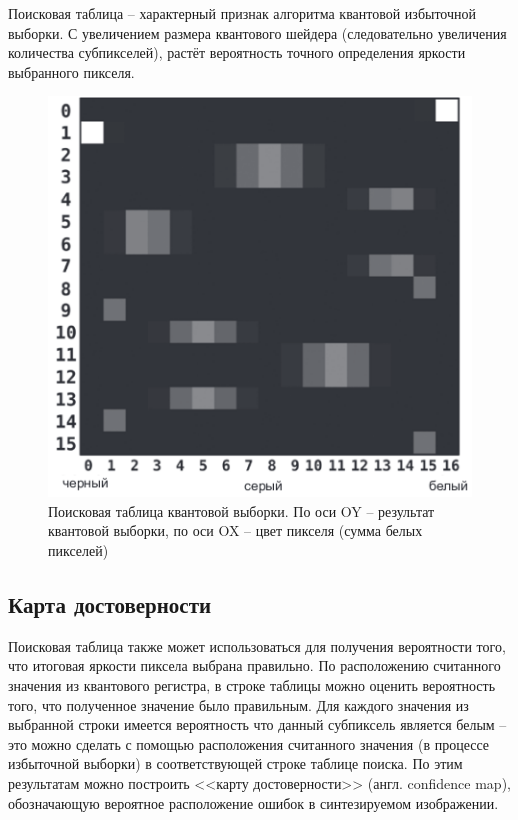 Поисковая таблица -- характерный признак алгоритма квантовой избыточной выборки. С увеличением размера квантового шейдера (следовательно увеличения количества субпикселей), растёт вероятность точного определения яркости выбранного пикселя.

\begin{figure}[H]
	\begin{center}
		\includegraphics[scale=0.55]{img/qss_table.png}
	\end{center}
	\captionsetup{justification=centering}
	\caption{Поисковая таблица квантовой выборки. По оси OY -- результат квантовой выборки, по оси OX -- цвет пикселя (сумма белых пикселей)}
	\label{img:qss_table}
\end{figure}

\subsection{Карта достоверности}\label{map}

Поисковая таблица также может использоваться для получения вероятности того, что итоговая яркости пиксела выбрана правильно. По расположению считанного значения из квантового регистра, в строке таблицы можно оценить вероятность того, что полученное значение было правильным. Для каждого значения из выбранной строки имеется вероятность что данный субпиксель является белым -- это можно сделать с помощью расположения считанного значения (в процессе избыточной выборки) в соответствующей строке таблице поиска. По этим результатам можно построить <<карту достоверности>> (англ. confidence map), обозначающую вероятное расположение ошибок в синтезируемом изображении.

